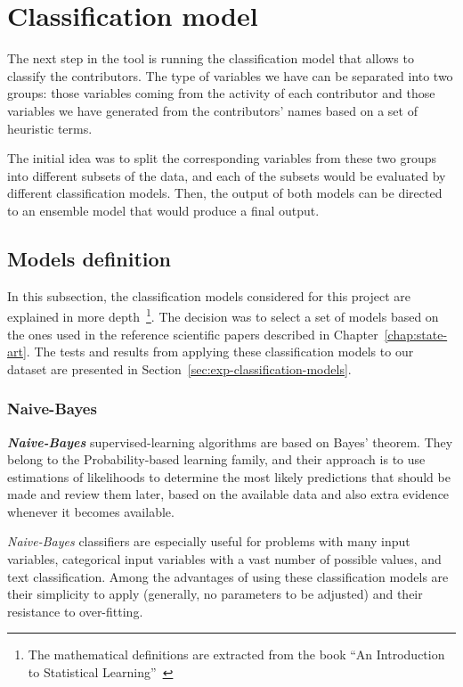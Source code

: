 \documentclass[a4paper, 12pt]{book}
\begin{document}
\section{Classification model} 
\label{sec:classification-model}

The next step in the tool is running the classification model that allows to classify the contributors. The type of variables we have can be separated into two groups: those variables coming from the activity of each contributor and those variables we have generated from the contributors' names based on a set of heuristic terms.

The initial idea was to split the corresponding variables from these two groups into different subsets of the data, and each of the subsets would be evaluated by different classification models. Then, the output of both models can be directed to an ensemble model that would produce a final output.

\subsection{Models definition}
\label{ssec:models-definition}

In this subsection, the classification models considered for this project are explained in more depth~\footnote{The mathematical definitions are extracted from the book ``An Introduction to Statistical Learning''~\cite{introstatlearning}}. The decision was to select a set of models based on the ones used in the reference scientific papers described in Chapter~\ref{chap:state-art}. The tests and results from applying these classification models to our dataset are presented in Section~\ref{sec:exp-classification-models}.

\subsubsection{Naive-Bayes}
\label{sssec:gaussian-naive-bayes}

\textit{\textbf{Naive-Bayes}} supervised-learning algorithms are based on Bayes’ theorem. They belong to the Probability-based learning family, and their approach is to use estimations of likelihoods to determine the most likely predictions that should be made and review them later, based on the available data and also extra evidence whenever it becomes available.

\textit{Naive-Bayes} classifiers are especially useful for problems with many input variables, categorical input variables with a vast number of possible values, and text classification. Among the advantages of using these classification models are their simplicity to apply (generally, no parameters to be adjusted) and their resistance to over-fitting.
\end{document}
